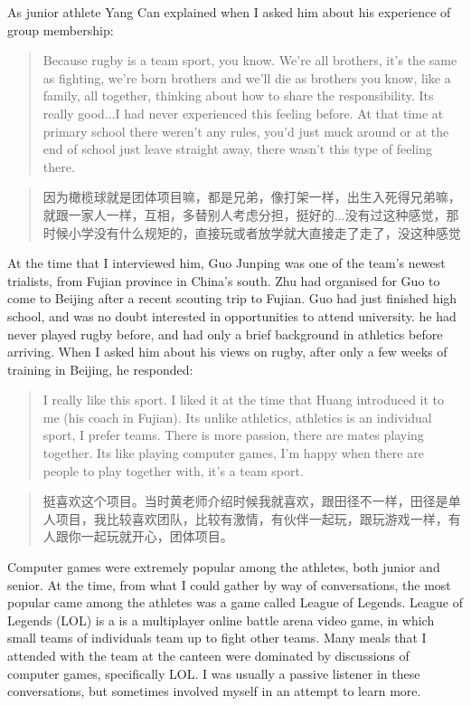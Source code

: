 \begin{CJK}{UTF8}{gbsn}
As junior athlete Yang Can explained when I asked him about his experience of group membership:

    \begin{quotation}
      Because rugby is a team sport, you know. We’re all brothers, it's the same as fighting, we’re born brothers and we’ll die as brothers you know, like a family, all together, thinking about how to share the responsibility. Its really good...I had never experienced this feeling before.  At that time at primary school there weren’t any rules, you’d just muck around or at the end of school just leave straight away, there wasn’t this type of feeling there.
    \end{quotation}

    \begin{quotation}
      因为橄榄球就是团体项目嘛，都是兄弟，像打架一样，出生入死得兄弟嘛，就跟一家人一样，互相，多替别人考虑分担，挺好的...没有过这种感觉，那时候小学没有什么规矩的，直接玩或者放学就大直接走了走了，没这种感觉
    \end{quotation}

At the time that I interviewed him, Guo Junping  was one of the team's newest trialists, from Fujian province in China's south.  Zhu had organised for Guo to come to Beijing after a recent scouting trip to Fujian.  Guo had just finished high school, and was no doubt interested in opportunities to attend university. he had never played rugby before, and had only a brief background in athletics before arriving.  When I asked him about his views on rugby, after only a few weeks of training in Beijing, he responded:

  \begin{quotation}
      I really like this sport.  I liked it at the time that Huang introduced it to me (his coach in Fujian). Its unlike athletics, athletics is an individual sport, I prefer teams.  There is more passion, there are mates playing together.  Its like playing computer games, I’m happy when there are people to play together with, it's a team sport.
  \end{quotation}

  \begin{quotation}
    	挺喜欢这个项目。当时黄老师介绍时候我就喜欢，跟田径不一样，田径是单人项目，我比较喜欢团队，比较有激情，有伙伴一起玩，跟玩游戏一样，有人跟你一起玩就开心，团体项目。
  \end{quotation}

Computer games were extremely popular among the athletes, both junior and senior.  At the time, from what I could gather by way of conversations, the most popular came among the athletes was a game called League of Legends.  League of Legends (LOL) is a is a multiplayer online battle arena video game, in which small teams of individuals team up to fight other teams.  Many meals that I attended with the team at the canteen were dominated by discussions of computer games, specifically LOL. I was usually a passive listener in these conversations, but sometimes involved myself in an attempt to learn more.



\end{CJK}
